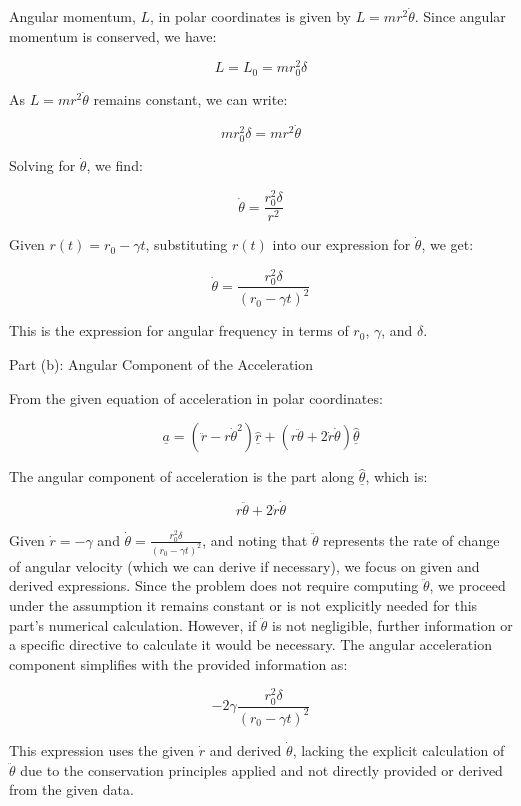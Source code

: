 Angular momentum, \(L\), in polar coordinates is given by \(L = m r^2 \dot{\theta}\). Since angular momentum is conserved, we have:

\[
L = L_0 = m r_0^2 \delta
\]

As \(L = m r^2 \dot{\theta}\) remains constant, we can write:

\[
m r_0^2 \delta = m r^2 \dot{\theta}
\]

Solving for \(\dot{\theta}\), we find:

\[
\dot{\theta} = \frac{r_0^2 \delta}{r^2}
\]

Given \(r(t) = r_0 - \gamma t\), substituting \(r(t)\) into our expression for \(\dot{\theta}\), we get:

\[
\dot{\theta} = \frac{r_0^2 \delta}{(r_0 - \gamma t)^2}
\]

This is the expression for angular frequency in terms of \(r_0\), \(\gamma\), and \(\delta\).

Part (b): Angular Component of the Acceleration

From the given equation of acceleration in polar coordinates:

\[
\underline{a} = (\ddot{r} - r \dot{\theta}^{2}) \underline{\hat{r}} + (r \ddot{\theta} + 2\dot{r}\dot{\theta} ) \underline{\hat{\theta}}
\]

The angular component of acceleration is the part along \(\underline{\hat{\theta}}\), which is:

\[
r \ddot{\theta} + 2\dot{r}\dot{\theta}
\]

Given \(\dot{r} = -\gamma\) and \(\dot{\theta} = \frac{r_0^2 \delta}{(r_0 - \gamma t)^2}\), and noting that \(\ddot{\theta}\) represents the rate of change of angular velocity (which we can derive if necessary), we focus on given and derived expressions. Since the problem does not require computing \(\ddot{\theta}\), we proceed under the assumption it remains constant or is not explicitly needed for this part's numerical calculation. However, if \(\ddot{\theta}\) is not negligible, further information or a specific directive to calculate it would be necessary. The angular acceleration component simplifies with the provided information as:

\[
-2\gamma \frac{r_0^2 \delta}{(r_0 - \gamma t)^2}
\]

This expression uses the given \(\dot{r}\) and derived \(\dot{\theta}\), lacking the explicit calculation of \(\ddot{\theta}\) due to the conservation principles applied and not directly provided or derived from the given data.

